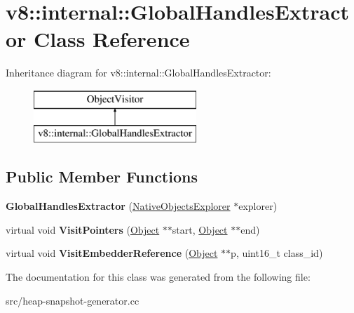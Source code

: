 \hypertarget{classv8_1_1internal_1_1_global_handles_extractor}{}\section{v8\+:\+:internal\+:\+:Global\+Handles\+Extractor Class Reference}
\label{classv8_1_1internal_1_1_global_handles_extractor}
Inheritance diagram for v8\+:\+:internal\+:\+:Global\+Handles\+Extractor\+:\begin{figure}[H]
\begin{center}
\leavevmode
\includegraphics[height=2.000000cm]{classv8_1_1internal_1_1_global_handles_extractor}
\end{center}
\end{figure}
\subsection*{Public Member Functions}
\begin{DoxyCompactItemize}
\item 
\hypertarget{classv8_1_1internal_1_1_global_handles_extractor_a7bf2d1963cb622b0a74570723b6d43d4}{}{\bfseries Global\+Handles\+Extractor} (\hyperlink{classv8_1_1internal_1_1_native_objects_explorer}{Native\+Objects\+Explorer} $\ast$explorer)\label{classv8_1_1internal_1_1_global_handles_extractor_a7bf2d1963cb622b0a74570723b6d43d4}

\item 
\hypertarget{classv8_1_1internal_1_1_global_handles_extractor_a4923c9a4dd1bd597e568825823977782}{}virtual void {\bfseries Visit\+Pointers} (\hyperlink{classv8_1_1internal_1_1_object}{Object} $\ast$$\ast$start, \hyperlink{classv8_1_1internal_1_1_object}{Object} $\ast$$\ast$end)\label{classv8_1_1internal_1_1_global_handles_extractor_a4923c9a4dd1bd597e568825823977782}

\item 
\hypertarget{classv8_1_1internal_1_1_global_handles_extractor_a509caac5d2b8695016c5d90307b0bbfe}{}virtual void {\bfseries Visit\+Embedder\+Reference} (\hyperlink{classv8_1_1internal_1_1_object}{Object} $\ast$$\ast$p, uint16\+\_\+t class\+\_\+id)\label{classv8_1_1internal_1_1_global_handles_extractor_a509caac5d2b8695016c5d90307b0bbfe}

\end{DoxyCompactItemize}


The documentation for this class was generated from the following file\+:\begin{DoxyCompactItemize}
\item 
src/heap-\/snapshot-\/generator.\+cc\end{DoxyCompactItemize}
